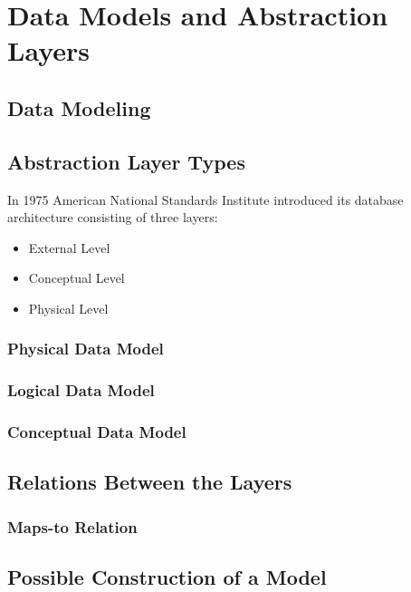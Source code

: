 \chapter{Data Models and Abstraction Layers}

\section{Data Modeling}

\section{Abstraction Layer Types}


In 1975 American National Standards Institute \cite{ANSIArchitecture75} introduced its database architecture consisting of three layers:
\begin{itemize}
	\item  External Level
	\item Conceptual Level
	\item Physical Level
\end{itemize}

\subsection{Physical Data Model}

\subsection{Logical Data Model}

\subsection{Conceptual Data Model}

\section{Relations Between the Layers}

\subsection{Maps-to Relation}

\section{Possible Construction of a Model}

